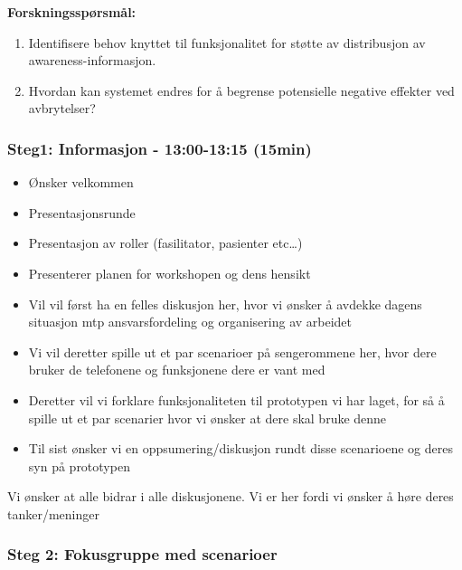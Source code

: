 \pagebreak

\textbf{Forskningsspørsmål:}
\begin{enumerate}
  \item Identifisere behov knyttet til funksjonalitet for støtte av distribusjon av awareness-informasjon.
  \item Hvordan kan systemet endres for å begrense potensielle negative effekter ved avbrytelser?
\end{enumerate}

\subsubsection{Steg1: Informasjon - 13:00-13:15 (15min)}
\begin{itemize}
  \item Ønsker velkommen
  \item Presentasjonsrunde
  \item Presentasjon av roller (fasilitator, pasienter etc\ldots)
  \item Presenterer planen for workshopen og dens hensikt
  	\item Vil vil først ha en felles diskusjon her, hvor vi ønsker å avdekke dagens situasjon mtp ansvarsfordeling og organisering av arbeidet
  	\item Vi vil deretter spille ut et par scenarioer på sengerommene her, hvor dere bruker de telefonene og funksjonene dere er vant med
  	\item Deretter vil vi forklare funksjonaliteten til prototypen vi har laget, for så å spille ut et par scenarier hvor vi ønsker at dere skal bruke denne
  	\item Til sist ønsker vi en oppsumering/diskusjon rundt disse scenarioene og deres syn på prototypen  	
\end{itemize}

\noindent
Vi ønsker at alle bidrar i alle diskusjonene. Vi er her fordi vi ønsker å høre deres tanker/meninger

\subsubsection{Steg 2: Fokusgruppe med scenarioer}

